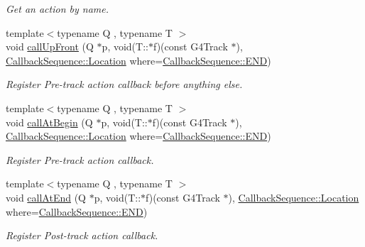 \begin{DoxyCompactItemize}
\begin{DoxyCompactList}\small\item\em Get an action by name. \end{DoxyCompactList}\item 
{\footnotesize template$<$typename Q , typename T $>$ }\\void \hyperlink{class_d_d4hep_1_1_simulation_1_1_geant4_tracking_action_sequence_aa4b5d6290cb6ba9b017aac6acb6bd264}{call\+Up\+Front} (Q $\ast$p, void(T\+::$\ast$f)(const G4\+Track $\ast$), \hyperlink{struct_d_d4hep_1_1_callback_sequence_a7753490247479633aed16a2376821ef7}{Callback\+Sequence\+::\+Location} where=\hyperlink{struct_d_d4hep_1_1_callback_sequence_a7753490247479633aed16a2376821ef7ac39eeb1bcfc1c235ab1d0d9315c310ac}{Callback\+Sequence\+::\+E\+ND})
\begin{DoxyCompactList}\small\item\em Register Pre-\/track action callback before anything else. \end{DoxyCompactList}\item 
{\footnotesize template$<$typename Q , typename T $>$ }\\void \hyperlink{class_d_d4hep_1_1_simulation_1_1_geant4_tracking_action_sequence_a43f9d8c580c0187a4972469306b0137e}{call\+At\+Begin} (Q $\ast$p, void(T\+::$\ast$f)(const G4\+Track $\ast$), \hyperlink{struct_d_d4hep_1_1_callback_sequence_a7753490247479633aed16a2376821ef7}{Callback\+Sequence\+::\+Location} where=\hyperlink{struct_d_d4hep_1_1_callback_sequence_a7753490247479633aed16a2376821ef7ac39eeb1bcfc1c235ab1d0d9315c310ac}{Callback\+Sequence\+::\+E\+ND})
\begin{DoxyCompactList}\small\item\em Register Pre-\/track action callback. \end{DoxyCompactList}\item 
{\footnotesize template$<$typename Q , typename T $>$ }\\void \hyperlink{class_d_d4hep_1_1_simulation_1_1_geant4_tracking_action_sequence_afdbe23daf4e6f3e639916b24c4f4de7a}{call\+At\+End} (Q $\ast$p, void(T\+::$\ast$f)(const G4\+Track $\ast$), \hyperlink{struct_d_d4hep_1_1_callback_sequence_a7753490247479633aed16a2376821ef7}{Callback\+Sequence\+::\+Location} where=\hyperlink{struct_d_d4hep_1_1_callback_sequence_a7753490247479633aed16a2376821ef7ac39eeb1bcfc1c235ab1d0d9315c310ac}{Callback\+Sequence\+::\+E\+ND})
\begin{DoxyCompactList}\small\item\em Register Post-\/track action callback. \end{DoxyCompactList}\item 

\end{DoxyCompactItemize}
